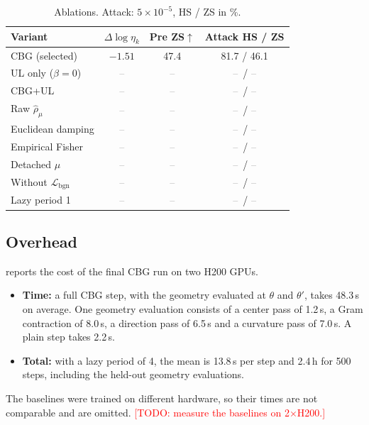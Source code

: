 \documentclass[11pt]{article}
\newcommand{\Lbgn}{\mathcal{L}_{\mathrm{bgn}}}
\newcommand{\rhohat}{\widehat{\rho}_{\mu}}
\newcommand{\etak}{\eta_{k}}
\newcommand{\tbd}{\textcolor{gray}{--}}
\newcommand{\todo}[1]{\textcolor{red}{[TODO: #1]}}
\begin{document}
\begin{table}[t]
\centering
\small
\caption{Ablations. Attack: $5\times10^{-5}$, HS / ZS in \%.}
\label{tab:ablation}
\begin{tabular}{lccc}
\toprule
Variant & $\Delta\log\etak$ & Pre ZS$\uparrow$ & Attack HS / ZS\\
\midrule
CBG (selected)              & $-1.51$ & 47.4 & 81.7 / 46.1\\
UL only ($\beta=0$)         & \tbd & \tbd & \tbd\ / \tbd\\
CBG+UL                      & \tbd & \tbd & \tbd\ / \tbd\\
Raw $\rhohat$               & \tbd & \tbd & \tbd\ / \tbd\\
Euclidean damping           & \tbd & \tbd & \tbd\ / \tbd\\
Empirical Fisher            & \tbd & \tbd & \tbd\ / \tbd\\
Detached $\mu$              & \tbd & \tbd & \tbd\ / \tbd\\
Without $\Lbgn$             & \tbd & \tbd & \tbd\ / \tbd\\
Lazy period 1               & \tbd & \tbd & \tbd\ / \tbd\\
\bottomrule
\end{tabular}
\end{table}

\subsection{Overhead}
\label{sec:overhead}

 reports the cost of the final CBG run on two H200 GPUs.
\begin{itemize}
  \item \textbf{Time:} a full CBG step, with the geometry evaluated at $\theta$ and $\theta'$, takes 48.3\,s on average. One geometry evaluation consists of a center pass of 1.2\,s, a Gram contraction of 8.0\,s, a direction pass of 6.5\,s and a curvature pass of 7.0\,s. A plain step takes 2.2\,s.
  \item \textbf{Total:} with a lazy period of 4, the mean is 13.8\,s per step and 2.4\,h for 500 steps, including the held-out geometry evaluations.
\end{itemize}
The baselines were trained on different hardware, so their times are not comparable and are omitted. \todo{measure the baselines on 2$\times$H200.}
\end{document}
